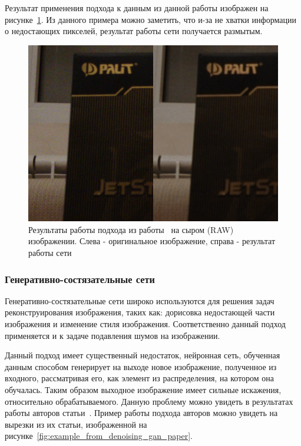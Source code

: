 \documentclass[14pt]{mmcs_article}
\begin{document}
Результат применения подхода к данным из данной работы изображен на рисунке~\ref{fig:noise2noise_our_data_example}. Из данного примера можно заметить, что и-за не хватки информации о недостающих пикселей, результат работы сети получается размытым.

\begin{figure}[H]
	\centering
	\includegraphics[width=\textwidth]{img/noise2noise_our_data_example}
	\caption{Результаты работы подхода из работы~\autocite{Noise2NoisePaper} на сыром (RAW) изображении. Слева - оригинальное изображение, справа - результат работы сети}
	\label{fig:noise2noise_our_data_example}
\end{figure}


\subsubsection{Генеративно-состязательные сети}

Генеративно-состязательные сети широко используются для решения задач реконструирования изображения, таких как: дорисовка недостающей части изображения и изменение стиля изображения. Соответственно данный подход применяется и к задаче подавления шумов на изображении.

Данный подход имеет существенный недостаток, нейронная сеть, обученная данным способом генерирует на выходе новое изображение, полученное из входного, рассматривая его, как элемент из распределения, на котором она обучалась. Таким образом выходное изображение имеет сильные искажения, относительно обрабатываемого. Данную проблему можно увидеть в результатах работы авторов статьи~\autocite{DenoisingGANPaper}. Пример работы подхода авторов можно увидеть на вырезки из их статьи, изображенной на рисунке~\ref{fig:example_from_denoising_gan_paper}.
\end{document}
